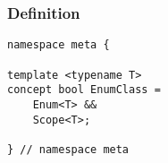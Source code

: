 
\subsubsection{Definition}

\begin{verbatim}
namespace meta {

template <typename T>
concept bool EnumClass =
	Enum<T> &&
	Scope<T>;

} // namespace meta
\end{verbatim}
